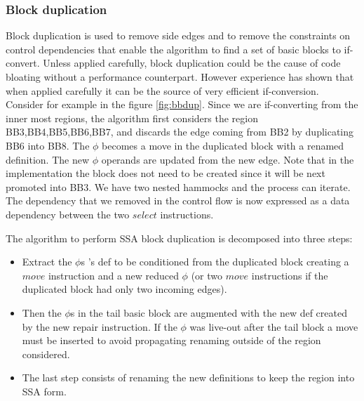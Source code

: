 \subsubsection{Block duplication}

Block duplication is used to remove side edges and to remove the constraints on control dependencies that enable the algorithm to find a set of basic blocks to if-convert. Unless applied carefully, block duplication could be the cause of code bloating without a performance counterpart. However experience has shown that when applied carefully it can be the source of very efficient if-conversion. Consider for example in the figure \ref{fig:bbdup}. Since we are if-converting from the inner most regions, the algorithm first considers the region {BB3,BB4,BB5,BB6,BB7}, and discards the edge coming from BB2 by duplicating BB6 into BB8. The $\phi$ becomes a move in the duplicated block with a renamed definition. The new $\phi$ operands are updated from the new edge. Note that in the implementation the block does not need to be created since it will be next promoted into BB3. We have two nested hammocks and the process can iterate. The dependency that we removed in the control flow is now expressed as a data dependency between the two $select$ instructions.

The algorithm to perform SSA block duplication is decomposed into three steps: 
\begin{itemize}
\item Extract the $\phi$s 's def to be conditioned from the duplicated block creating a $move$ instruction and a new reduced $\phi$ (or two $move$ instructions if the duplicated block had only two incoming edges).
\item Then the $\phi$s in the tail basic block are augmented with the new def created by the new repair instruction. If the $\phi$ was live-out after the tail block a move must be inserted to avoid propagating renaming outside of the region considered. 
\item The last step consists of renaming the new definitions to keep the region into SSA form.
\end{itemize}

